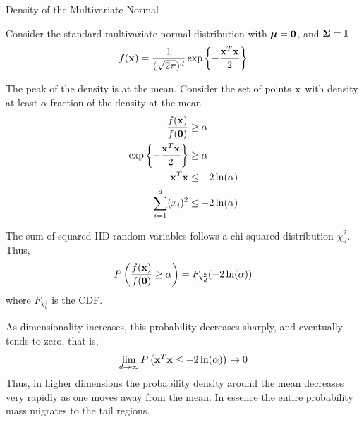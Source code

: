 \begin{frame}{Density of the Multivariate Normal}

  \small

Consider the standard multivariate normal distribution
with ${\bm \mu} = \mathbf{0}$, and ${\bm \Sigma} = \mathbf{I}$ 
\begin{align*}
f(\mathbf{x}) = \frac{1}{(\sqrt{2\pi})^d}\exp\left\{-\frac{\mathbf{x}^T
\mathbf{x}}{2}\right\}
\end{align*}

\medskip
The peak of the density is at the mean. 
Consider the set of points $\mathbf{x}$ with density at least
$\alpha$ fraction of the density at the mean
\begin{align*}
\frac{f(\mathbf{x})}{f(\mathbf{0})} & \ge \alpha\nonumber\\
\exp\left\{-\frac{\mathbf{x}^T\mathbf{x}}{2}\right\}  & \ge \alpha\nonumber\\
 \mathbf{x}^T\mathbf{x}  & \le -2 \ln (\alpha)\nonumber\\
  \sum_{i=1}^d (x_i)^2 & \le -2 \ln (\alpha)
\end{align*}

\medskip
The sum of squared IID random variables follows a chi-squared
distribution $\chi^2_d$. Thus,
\begin{align*}
P\left(\frac{f(\mathbf{x})}{f(\mathbf{0})} \geq \alpha\right) 
=  F_{\chi^2_d}(-2\ln(\alpha))
\end{align*}
where $F_{\chi^2_q}$ is the CDF.

\medskip
As dimensionality increases, this probability
decreases sharply, and eventually tends to zero, that is,
\begin{equation*}
\lim_{d\to\infty}  P\left( \mathbf{x}^T\mathbf{x} \le -2\ln(\alpha) \right) \to 0
\end{equation*}
Thus, in higher dimensions the probability density around the
mean decreases very rapidly as one moves away from the mean. In
essence the entire probability mass migrates to the tail regions.
\end{frame}



\def\pshlabel#1{\scriptsize {$#1$}}
\def\psvlabel#1{\scriptsize {$#1$}}




